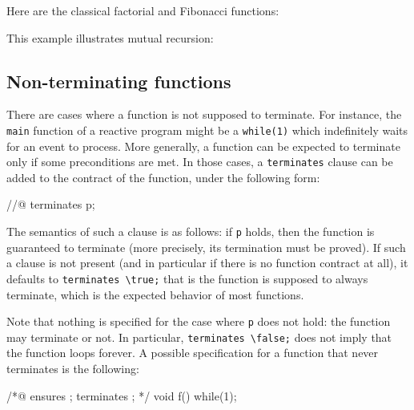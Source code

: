 \begin{example}
  Here are the classical factorial and Fibonacci functions:
\end{example}

\begin{example}
  This example illustrates mutual recursion:
\end{example}




\subsection{Non-terminating functions}
\label{sec:non-term-funct}
\experimental

There are cases where a function is not supposed to terminate. For
instance, the \lstinline|main| function of a reactive program might be a
\lstinline|while(1)| which indefinitely waits for an event to process. More
generally, a function can be expected to terminate only if some
preconditions are met. In those cases, a \lstinline|terminates| clause can
be added to the contract of the function, under the following form:

\begin{listing-nonumber}
//@ terminates p;
\end{listing-nonumber}

The semantics of such a clause is as follows: if \lstinline|p| holds, then the
function is guaranteed to terminate (more precisely, its
termination must be proved). If such a clause is not present (and in
particular if there is no function contract at all), it
defaults to \lstinline|terminates \true;| that is the function is supposed
to always terminate, which is the expected behavior of most
functions.

Note that nothing is specified for the case where \lstinline|p| does not hold:
the function may terminate or not. In particular,
\lstinline|terminates \false;| does not imply that the function loops
forever. A possible specification for a function that never terminates
is the following:
\begin{listing}{1}
/*@ ensures \false;
    terminates \false;
*/
void f() { while(1); }
\end{listing}

